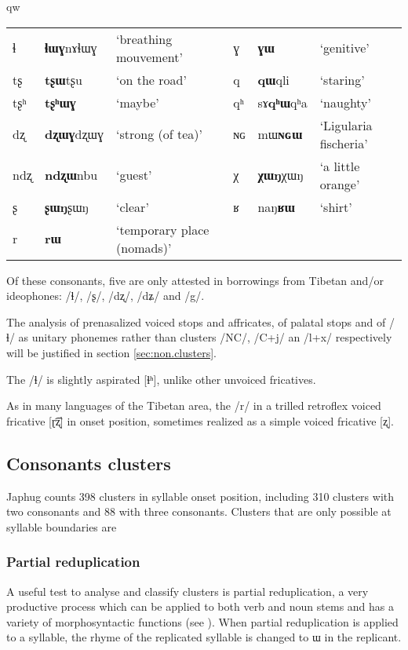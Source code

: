 qw\documentclass[oldfontcommands,oneside,a4paper,11pt]{article}
\newcommand{\ipa}[1]{{\phon #1}} %
\begin{document}
\begin{table}
{\begin{tabular}{lll|lll}
ɬ   & 	  \ipa{\textbf{ɬɯɣ}nɤɬɯɣ}   & 	 `breathing mouvement' & 	ɣ & 	\ipa{\textbf{ɣɯ}}   & 	 `genitive' \\ 
tʂ   & 	  \ipa{\textbf{tʂɯ}tʂu}   & 	 `on the road' & 	q & 	\ipa{\textbf{qɯ}qli}   & 	 `staring' \\ 
tʂʰ   & 	  \ipa{\textbf{tʂʰɯɣ}}   & 	 `maybe' & 	qʰ & 	\ipa{sɤ\textbf{qʰɯ}qʰa}   & 	 `naughty' \\ 
dʐ   & 	\ipa{\textbf{dʐɯɣ}dʐɯɣ}   & 	 `strong (of tea)' & 	ɴɢ & 	\ipa{mɯ\textbf{ɴɢɯ}}  & 	 `Ligularia fischeria' \\ 
ndʐ & 	\ipa{\textbf{ndʐɯ}nbu}   & 	 `guest' & 	χ & 	\ipa{\textbf{χɯŋ}χɯŋ}   & 	 `a little orange' \\ 
ʂ & 	\ipa{\textbf{ʂɯŋ}ʂɯŋ}   & 	 `clear' & 	ʁ & 	\ipa{naŋ\textbf{ʁɯ}}   & 	 `shirt' \\ 
r & 	\ipa{\textbf{rɯ}}   & 	 `temporary place (nomads)' & 	  & 	 & 	 \\ 
\bottomrule
\end{tabular}}
\end{table}

Of these consonants, five are only attested in borrowings from Tibetan and/or ideophones: /ɬ/, /ʂ/, /dʐ/, /dʑ/ and /g/.

The analysis of prenasalized voiced stops and affricates, of palatal stops and of /ɬ/ as unitary phonemes rather than clusters /NC/, /C+j/ an /l+x/ respectively will be justified in section \ref{sec:non.clusters}. 

The /ɬ/ is slightly aspirated [ɬʰ], unlike other unvoiced fricatives.


As in many languages of the Tibetan area, the /r/ in a trilled retroflex voiced fricative [ɽ͡ʐ] in onset position, sometimes realized as a simple voiced fricative [ʐ].


  \subsection{Consonants clusters} \label{sec:clusters}
  Japhug counts 398 clusters in syllable onset position, including  310 clusters with two consonants and 88 with three consonants. Clusters that are only possible at syllable boundaries are
  
  \subsubsection{Partial reduplication} \label{sec:redp}
 A useful test to analyse and classify clusters is partial reduplication, a very productive process which can be applied to both verb and noun stems and has a variety of morphosyntactic functions (see \citealt{jacques07redupl}). When partial reduplication is applied to a syllable, the rhyme of the replicated syllable is changed to \ipa{ɯ} in the replicant.
 
\end{document}
